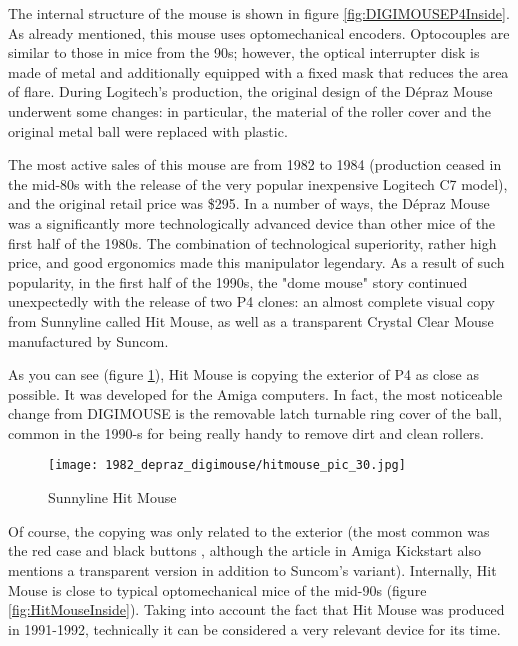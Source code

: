 \documentclass[11pt, a4paper]{article}
\begin{document}
The internal structure of the mouse is shown in figure \ref{fig:DIGIMOUSEP4Inside}. As already mentioned, this mouse uses optomechanical encoders. Optocouples are similar to those in mice from the 90s; however, the optical interrupter disk is made of metal and additionally equipped with a fixed mask that reduces the area of flare. During Logitech's production, the original design of the D\'epraz Mouse underwent some changes: in particular, the material of the roller cover and the original metal ball \cite{oldmouse} were replaced with plastic.

The most active sales of this mouse are from 1982 to 1984 (production ceased in the mid-80s with the release of the very popular inexpensive Logitech C7 model), and the original retail price was \$295. In a number of ways, the D\'epraz Mouse was a significantly more technologically advanced device than other mice of the first half of the 1980s. The combination of technological superiority, rather high price, and good ergonomics made this manipulator legendary. As a result of such popularity, in the first half of the 1990s, the "dome mouse" story continued unexpectedly with the release of two P4 clones: an almost complete visual copy from Sunnyline called Hit Mouse\cite{sunnyline}, as well as a transparent Crystal Clear Mouse manufactured by Suncom\cite{suncom}.

As you can see (figure \ref{fig:HitMousePic}), Hit Mouse is copying the exterior of P4 as close as possible. It was developed for the Amiga computers. In fact, the most noticeable change from DIGIMOUSE is the removable latch turnable ring cover of the ball, common in the 1990-s for being really handy to remove dirt and clean rollers.

\begin{figure}[h]
   \centering
    \texttt{[image: 1982\_depraz\_digimouse/hitmouse\_pic\_30.jpg]}
    \caption{Sunnyline Hit Mouse}
    \label{fig:HitMousePic}
\end{figure}

Of course, the copying was only related to the exterior (the most common was the red case and black buttons \cite{sunnyline, sunnilineDOS}, although the article in Amiga Kickstart also mentions a transparent version in addition to Suncom's variant). Internally, Hit Mouse is close to typical optomechanical mice of the mid-90s (figure \ref{fig:HitMouseInside}). Taking into account the fact that Hit Mouse was produced in 1991-1992, technically it can be considered a very relevant device for its time.
\end{document}

